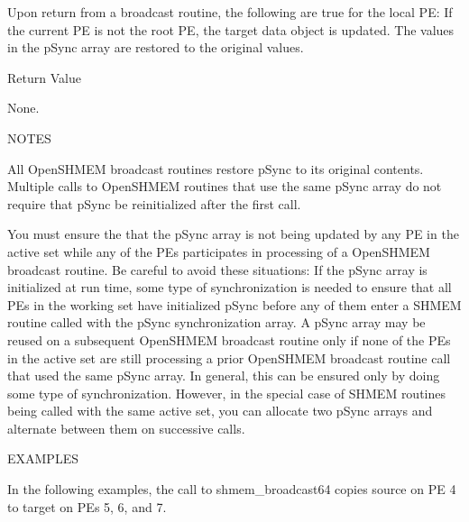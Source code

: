        Upon  return  from  a broadcast routine, the following are true for the
       local PE: If the current PE is not the root PE, the target data	object
       is updated.  The values in the pSync array are restored to the original
       values.

Return Value
       
	None.

NOTES

       All OpenSHMEM broadcast routines restore pSync to  its  original  contents.
       Multiple	 calls	to OpenSHMEM routines that use the same pSync array do not
       require that pSync be reinitialized after the first call.

       You must ensure the that the pSync array is not being updated by any PE
       in  the active set while any of the PEs participates in processing of a
       OpenSHMEM broadcast routine.	 Be careful to avoid these situations: If  the
       pSync array is initialized at run time, some type of synchronization is
       needed to ensure that all PEs in the working set have initialized pSync
       before  any  of	them  enter  a	SHMEM  routine	called	with the pSync
       synchronization array.  A pSync array may be  reused  on	 a  subsequent
       OpenSHMEM  broadcast	 routine only if none of the PEs in the active set are
       still processing a prior OpenSHMEM broadcast routine	 call  that  used  the
       same  pSync  array.  In general, this can be ensured only by doing some
       type of	synchronization.   However,  in	 the  special  case  of	 SHMEM
       routines	 being	called	with the same active set, you can allocate two
       pSync arrays and alternate between them on successive calls.

EXAMPLES

       In the following examples, the call to shmem_broadcast64 copies	source
       on PE 4 to target on PEs 5, 6, and 7.

       

       
